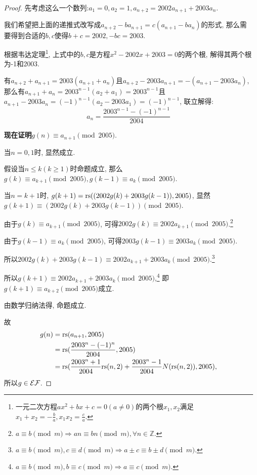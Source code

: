 \begin{proof}
    先考虑这么一个数列:$a_1=0,a_2=1,a_{n+2}=2002a_{n+1}+2003a_{n}$.

    我们希望把上面的递推式改写成$a_{n+2}-ba_{n+1}=c(a_{n+1}-ba_n)$的形式, 那么需要得到合适的$b,c$使得$b+c=2002,-bc=2003$.

    根据韦达定理\footnote{一元二次方程$ax^2+bx+c=0(a\neq 0)$的两个根$x_1,x_2$满足$x_1+x_2=-\frac{b}{a}, x_1x_2=\frac{c}{a}$.}, 上式中的$b,c$是方程$x^2-2002x+2003=0$的两个根, 解得其两个根为-1和2003.

    有$a_{n+2}+a_{n+1}=2003(a_{n+1}+a_n)$且$a_{n+2}-2003a_{n+1}=-(a_{n+1}-2003a_n)$,
    那么有$a_{n+1}+a_{n}=2003^{n-1}(a_2+a_1)=2003^{n-1}$且$a_{n+1}-2003a_n=(-1)^{n-1}(a_2-2003a_1)=(-1)^{n-1}$, 联立解得:
    $$a_n=\frac{2003^{n-1}-(-1)^{n-1}}{2004}$$
    
    \textbf{现在证明}$g(n)\equiv a_{n+1}\pmod{2005}$.
    
    当$n=0,1$时, 显然成立.

    假设当$n\leqslant k(k\geqslant 1)$时命题成立, 那么$g(k)\equiv a_{k+1}\pmod{2005}, g(k-1)\equiv a_{k}\pmod{2005}$.

    当$n=k+1$时, $g(k+1)=\mathrm{rs}((2002g(k)+2003g(k-1)),2005)$, 显然$g(k+1)\equiv (2002g(k)+2003g(k-1))\pmod{2005}$.

    由于$g(k)\equiv a_{k+1}\pmod{2005}$, 可得$2002g(k)\equiv 2002a_{k+1}\pmod{2005}$.\footnote{$a\equiv b\pmod{m}\Rightarrow an\equiv bn\pmod{m}, \forall n\in \mathbb{Z}.$}

    由于$g(k-1)\equiv a_{k}\pmod{2005}$, 可得$2003g(k-1)\equiv 2003a_{k}\pmod{2005}$.

    所以$2002g(k)+2003g(k-1)\equiv 2002a_{k+1}+2003a_k\pmod{2005}$.\footnote{$a\equiv b\pmod{m},c\equiv d\pmod{m}\Rightarrow a\pm c\equiv b\pm d\pmod{m}.$}

    所以$g(k+1)\equiv 2002a_{k+1}+2003a_k\pmod{2005}$,\footnote{$a\equiv b\pmod{m},b\equiv c\pmod{m}\Rightarrow a\equiv c\pmod{m}.$} 即$g(k+1)\equiv a_{k+2}\pmod{2005}$成立.

    由数学归纳法得, 命题成立.

    故$$\begin{aligned}
        g(n)&=\mathrm{rs}(a_{n+1},2005)\\
        &=\mathrm{rs}(\frac{2003^n-(-1)^n}{2004},2005)\\
        &=\mathrm{rs}(\frac{2003^n+1}{2004}\mathrm{rs}(n,2)+\frac{2003^n-1}{2004}N(\mathrm{rs}(n,2)),2005),
    \end{aligned}$$ 所以$g\in\mathcal{EF}$.


\end{proof}
